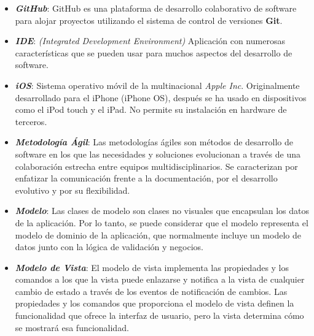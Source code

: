 \begin{itemize}
    \item \textbf{\textit{GitHub}}: GitHub es una plataforma de desarrollo 
    colaborativo de software para alojar proyectos utilizando el sistema de 
    control de versiones \textbf{Git}.

    \item \textbf{\textit{IDE}}: \emph{(Integrated Development Environment)} 
    Aplicación con numerosas características que se pueden usar para muchos 
    aspectos del desarrollo de software.

    \item \textbf{\textit{iOS}}: Sistema operativo móvil de la multinacional
    \emph{Apple Inc}. Originalmente desarrollado para el iPhone (iPhone OS), 
    después se ha usado en dispositivos como el iPod touch y el iPad. 
    No permite su instalación en hardware de terceros.
    
    \item \textbf{\textit{Metodología Ágil}}: Las metodologías ágiles son 
    métodos de desarrollo de software en los que las necesidades y soluciones 
    evolucionan a través de una colaboración estrecha entre equipos 
    multidisciplinarios. Se caracterizan por enfatizar la comunicación 
    frente a la documentación, por el desarrollo evolutivo y por su 
    flexibilidad.
    
    \item \textbf{\textit{Modelo}}: Las clases de modelo son clases no 
    visuales que encapsulan los datos de la aplicación. Por lo tanto, se 
    puede considerar que el modelo representa el modelo de dominio de la 
    aplicación, que normalmente incluye un modelo de datos junto con la 
    lógica de validación y negocios. 

    \item \textbf{\textit{Modelo de Vista}}: El modelo de vista implementa las 
    propiedades y los comandos a los que la vista puede enlazarse y notifica 
    a la vista de cualquier cambio de estado a través de los eventos de 
    notificación de cambios. Las propiedades y los comandos que proporciona 
    el modelo de vista definen la funcionalidad que ofrece la interfaz de 
    usuario, pero la vista determina cómo se mostrará esa funcionalidad.
    

\end{itemize}

